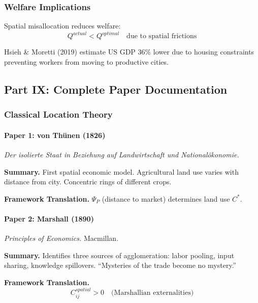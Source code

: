 \subsubsection{Welfare Implications}

Spatial misallocation reduces welfare:
\begin{equation}
Q^{actual} < Q^{optimal} \quad \text{due to spatial frictions}
\end{equation}

Hsieh \& Moretti (2019) estimate US GDP 36\% lower due to housing constraints 
preventing workers from moving to productive cities.

\subsection{Part IX: Complete Paper Documentation}

\subsubsection{Classical Location Theory}

\paragraph{Paper 1: von Thünen (1826)}

\textit{Der isolierte Staat in Beziehung auf Landwirtschaft und Nationalökonomie.}

\textbf{Summary.}
First spatial economic model. Agricultural land use varies with distance 
from city. Concentric rings of different crops.

\textbf{Framework Translation.}
$\Psi_P$ (distance to market) determines land use $C^*$.

\paragraph{Paper 2: Marshall (1890)}

\textit{Principles of Economics.}
Macmillan.

\textbf{Summary.}
Identifies three sources of agglomeration: labor pooling, input sharing, 
knowledge spillovers. ``Mysteries of the trade become no mystery.''

\textbf{Framework Translation.}
\begin{equation}
C_{ij}^{spatial} > 0 \quad \text{(Marshallian externalities)}
\end{equation}

